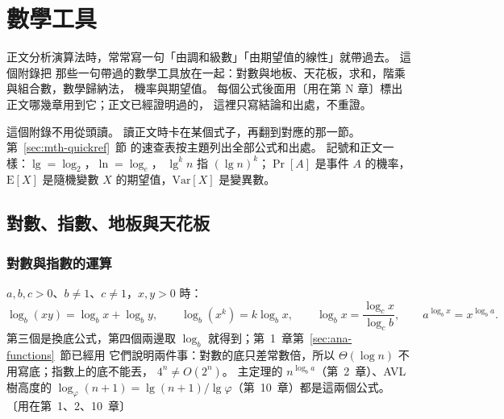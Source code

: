 \chapter{數學工具}
\label{ch:math}

\newcommand{\mthuse}[1]{{\small\color{black!55}〔用在第~#1~章〕}}
\newcommand{\mthex}[1]{\par\medskip\noindent\textbf{例：#1}\quad}

正文分析演算法時，常常寫一句「由調和級數」「由期望值的線性」就帶過去。 這個附錄把
那些一句帶過的數學工具放在一起：對數與地板、天花板，求和，階乘與組合數，數學歸納法，
機率與期望值。 每個公式後面用〔用在第 N 章〕標出正文哪幾章用到它；正文已經證明過的，
這裡只寫結論和出處，不重證。

這個附錄不用從頭讀。 讀正文時卡在某個式子，再翻到對應的那一節。 第~\ref{sec:mth-quickref}~節
的速查表按主題列出全部公式和出處。 記號和正文一樣：$\lg = \log_2$，$\ln = \log_e$，
$\lg^k n$ 指 $(\lg n)^k$；$\Pr[A]$ 是事件 $A$ 的機率，$\mathrm{E}[X]$ 是隨機變數 $X$
的期望值，$\mathrm{Var}[X]$ 是變異數。

\section{對數、指數、地板與天花板}
\label{sec:mth-log}

\subsection{對數與指數的運算}

$a, b, c > 0$、$b \ne 1$、$c \ne 1$，$x, y > 0$ 時：
\[
\log_b(xy) = \log_b x + \log_b y, \qquad
\log_b(x^k) = k \log_b x, \qquad
\log_b x = \frac{\log_c x}{\log_c b}, \qquad
a^{\log_b x} = x^{\log_b a}.
\]
第三個是換底公式，第四個兩邊取 $\log_b$ 就得到；第~1~章第~\ref{sec:ana-functions}~節已經用
它們說明兩件事：對數的底只差常數倍，所以 $\Theta(\log n)$ 不用寫底；指數上的底不能丟，
$4^n \ne O(2^n)$。 主定理的 $n^{\log_b a}$（第~2~章）、AVL 樹高度的
$\log_\varphi(n+1) = \lg(n+1) / \lg\varphi$（第~10~章）都是這兩個公式。
\mthuse{1、2、10}

